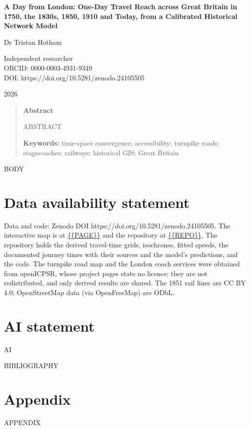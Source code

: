 \documentclass[11pt,a4paper]{article}
\begin{document}
\begin{center}
{\Large\bfseries A Day from London: One-Day Travel Reach across Great Britain in 1750, the 1830s, 1850, 1910 and Today, from a Calibrated Historical Network Model\par}
\vspace{1.2em}
{\large Dr Tristan Hotham\par}
\vspace{0.3em}
{\small Independent researcher\\
ORCID: 0000-0003-4931-9349\\
DOI: https://doi.org/10.5281/zenodo.24105505\par}
\vspace{0.8em}
2026
\end{center}

\begin{quote}
\small
\begin{center}\textbf{Abstract}\end{center}
{{ABSTRACT}}

\textbf{Keywords:} time-space convergence; accessibility; turnpike roads; stagecoaches; railways; historical GIS; Great Britain
\end{quote}

{{BODY}}

\section*{Data availability statement}
Data and code: Zenodo DOI https://doi.org/10.5281/zenodo.24105505. The interactive map is at \url{{{PAGE}}} and the repository at \url{{{REPO}}}. The repository holds the derived travel-time grids, isochrones, fitted speeds, the documented journey times with their sources and the model's predictions, and the code. The turnpike road map and the London coach services \citep{rosevear2023tp,rosevear2023coach} were obtained from openICPSR, whose project pages state no licence; they are not redistributed, and only derived results are shared. The 1851 rail lines \citep{satchell2023} are CC BY 4.0; OpenStreetMap data (via OpenFreeMap) are ODbL.

\section*{AI statement}
{{AI}}

{{BIBLIOGRAPHY}}

\clearpage
\appendix
\section{Appendix}
{{APPENDIX}}
\end{document}
